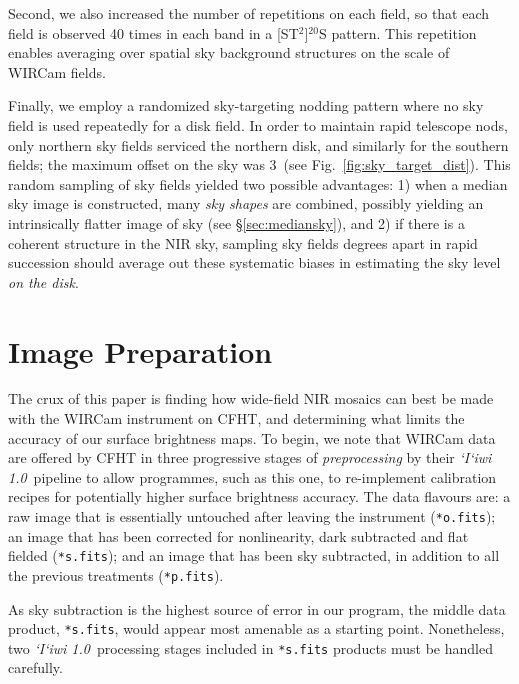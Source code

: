 \documentclass[iop]{emulateapj}
\newcommand{\sw}[1]{\textit{#1}} %
\newcommand{\iiwione}{\sw{`I`iwi 1.0}}
\newcommand{\Fig}[1]{Fig.~\ref{fig:#1}}  %
\newcommand{\Sec}[1]{\S\ref{sec:#1}}  %
\begin{document}
Second, we also increased the number of repetitions on each field, so that each field is observed 40 times in each band in a [ST$^2$]$^{20}$S pattern. This repetition enables averaging over spatial sky background structures on the scale of WIRCam fields.

Finally, we employ a randomized sky-targeting nodding pattern where no sky field is used repeatedly for a disk field.
In order to maintain rapid telescope nods, only northern sky fields serviced the northern disk, and similarly for the southern fields; the maximum offset on the sky was 3\arcdeg\ (see \Fig{sky_target_dist}).
This random sampling of sky fields yielded two possible advantages: 1) when a median sky image is constructed, many \emph{sky shapes} are combined, possibly yielding an intrinsically flatter image of sky (see \Sec{mediansky}), and 2) if there is a coherent structure in the NIR sky, sampling sky fields degrees apart in rapid succession should average out these systematic biases in estimating the sky level \emph{on the disk}.

\section{Image Preparation}
\label{sec:reduction}

The crux of this paper is finding how wide-field NIR mosaics can best be made with the WIRCam instrument on CFHT, and determining what limits the accuracy of our surface brightness maps.
To begin, we note that WIRCam data are offered by CFHT in three progressive stages of \emph{preprocessing} by their \iiwione\ pipeline to allow programmes, such as this one, to re-implement calibration recipes for potentially higher surface brightness accuracy.
The data flavours are: a raw image that is essentially untouched after leaving the instrument (\texttt{*o.fits}); an image that has been corrected for nonlinearity, dark subtracted and flat fielded (\texttt{*s.fits}); and an image that has been sky subtracted, in addition to all the previous treatments (\texttt{*p.fits}).

As sky subtraction is the highest source of error in our program, the middle data product, \texttt{*s.fits}, would appear most amenable as a starting point.
Nonetheless, two \iiwione\ processing stages included in \texttt{*s.fits} products must be handled carefully.
\end{document}
